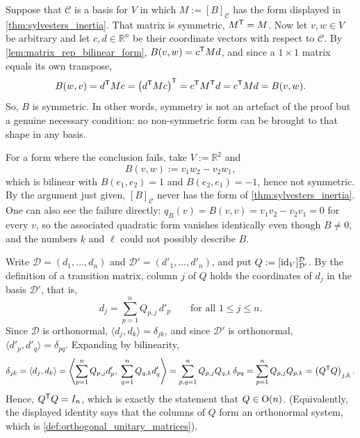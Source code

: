 \begin{exercisesolution}
\label{sol:sylvester_needs_symmetry}
Suppose that $\mathcal{C}$ is a basis for $V$ in which $M := [B]_{\mathcal{C}}$ has the form displayed in \cref{thm:sylvesters_inertia}. That matrix is symmetric, $M^{\mathsf{T}} = M$. Now let $v, w \in V$ be arbitrary and let $c, d \in \mathbb{R}^n$ be their coordinate vectors with respect to $\mathcal{C}$. By \cref{lem:matrix_rep_bilinear_form}, $B(v, w) = c^{\mathsf{T}} M d$, and since a $1 \times 1$ matrix equals its own transpose,
\[
    B(w, v) = d^{\mathsf{T}} M c = \left(d^{\mathsf{T}} M c\right)^{\mathsf{T}} = c^{\mathsf{T}} M^{\mathsf{T}} d = c^{\mathsf{T}} M d = B(v, w).
\]
So, $B$ is symmetric. In other words, symmetry is not an artefact of the proof but a genuine necessary condition: no non-symmetric form can be brought to that shape in any basis.

For a form where the conclusion fails, take $V := \mathbb{R}^2$ and
\[ B(v, w) := v_1 w_2 - v_2 w_1, \]
which is bilinear with $B(e_1, e_2) = 1$ and $B(e_2, e_1) = -1$, hence not symmetric. By the argument just given, $[B]_{\mathcal{C}}$ never has the form of \cref{thm:sylvesters_inertia}. One can also see the failure directly: $q_B(v) = B(v, v) = v_1 v_2 - v_2 v_1 = 0$ for every $v$, so the associated quadratic form vanishes identically even though $B \neq 0$, and the numbers $k$ and $\ell$ could not possibly describe $B$.
\end{exercisesolution}

\begin{exercisesolution}
\label{sol:transition_between_orthonormal_bases}
Write $\mathcal{D} = (d_1, \dots, d_n)$ and $\mathcal{D}' = (d'_1, \dots, d'_n)$, and put $Q := [\operatorname{id}_V]_{\mathcal{D}'}^{\mathcal{D}}$. By the definition of a transition matrix, column $j$ of $Q$ holds the coordinates of $d_j$ in the basis $\mathcal{D}'$, that is,
\[ d_j = \sum_{p=1}^n Q_{p,j} \, d'_p \qquad \text{for all } 1 \le j \le n. \]
Since $\mathcal{D}$ is orthonormal, $\langle d_j, d_k \rangle = \delta_{jk}$, and since $\mathcal{D}'$ is orthonormal, $\langle d'_p, d'_q \rangle = \delta_{pq}$. Expanding by bilinearity,
\[
    \delta_{jk} = \langle d_j, d_k \rangle = \left\langle \sum_{p=1}^n Q_{p,j} d'_p, \; \sum_{q=1}^n Q_{q,k} d'_q \right\rangle = \sum_{p,q=1}^n Q_{p,j} Q_{q,k} \, \delta_{pq} = \sum_{p=1}^n Q_{p,j} Q_{p,k} = \left(Q^{\mathsf{T}} Q\right)_{j,k}.
\]
Hence, $Q^{\mathsf{T}} Q = I_n$, which is exactly the statement that $Q \in \operatorname{O}(n)$. (Equivalently, the displayed identity says that the columns of $Q$ form an orthonormal system, which is \cref{def:orthogonal_unitary_matrices}).
\end{exercisesolution}

